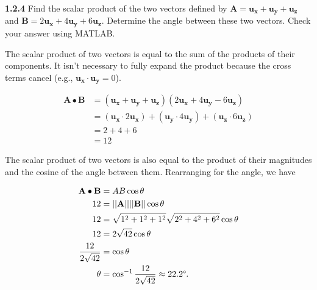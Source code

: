 \documentclass{article}
\begin{document}
\textbf{1.2.4} Find the scalar product of the two vectors defined by $\mathbf{A} = \mathbf{u_x} + \mathbf{u_y} +
	\mathbf{u_z}$ and $\mathbf{B} = 2\mathbf{u_x} + 4\mathbf{u_y} + 6\mathbf{u_z}$. Determine the angle between these
two vectors. Check your answer using MATLAB\@.

\vspace{24pt}

The scalar product of two vectors is equal to the sum of the products of their components. It isn't necessary to fully
expand the product because the cross terms cancel (e.g., $\mathbf{u_x} \cdot \mathbf{u_y} = 0$).

\begin{equation*}
	\begin{split}
		\mathbf{A} \bullet \mathbf{B} & = (\mathbf{u_x} + \mathbf{u_y} + \mathbf{u_z})(2\mathbf{u_x} + 4\mathbf{u_y} -
		6\mathbf{u_z}) \\
		& = (\mathbf{u_x} \cdot 2\mathbf{u_x}) + (\mathbf{u_y} \cdot 4\mathbf{u_y}) + (\mathbf{u_z} \cdot
		6\mathbf{u_z}) \\
		& = 2 + 4 + 6 \\
		& = 12
	\end{split}
\end{equation*}

The scalar product of two vectors is also equal to the product of their magnitudes and the cosine of the angle between
them. Rearranging for the angle, we have

\begin{equation*}
	\begin{split}
		\mathbf{A} \bullet \mathbf{B} & = AB\cos{\theta} \\
		12 & = ||\mathbf{A}||||\mathbf{B}||\cos{\theta} \\
		12 & = \sqrt{1^2 + 1^2 + 1^2}\sqrt{2^2 + 4^2 + 6^2}\cos{\theta} \\
		12 & = 2\sqrt{42}\cos{\theta} \\
		\frac{12}{2\sqrt{42}} & = \cos{\theta} \\
		\theta & = \cos^{-1}{\frac{12}{2\sqrt{42}}} \approx 22.2\degree.
	\end{split}
\end{equation*}
\end{document}
